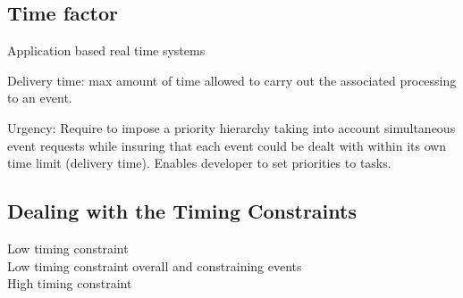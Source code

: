 \documentclass[10pt]{article}
\theoremstyle{plain}
\theoremstyle{definition}
\theoremstyle{remark}
\begin{document}
\subsection{Time factor}
Application based real time systems 
\begin{compactitem}
	\item Delivery time: max amount of time allowed to carry out the associated
		processing to an event.
	\item Urgency: Require to impose a priority hierarchy taking into account
		simultaneous event requests while insuring that each event could be
		dealt with within its own time limit (delivery time). Enables developer
		to set priorities to tasks.
\end{compactitem}

\subsection{Dealing with the Timing Constraints}
\begin{description}
	\item [Low timing constraint]
	\item[Low timing constraint overall and  constraining events]
	\item[High timing constraint]
\end{description}
\end{document}
